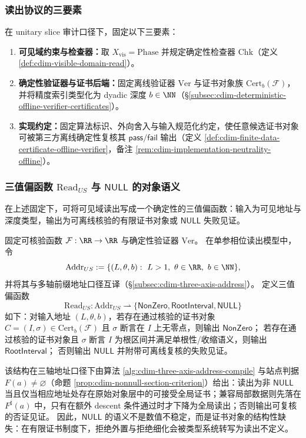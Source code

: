 \subsubsection{读出协议的三要素}
在 unitary slice 审计口径下，固定以下三要素：
\begin{enumerate}
  \item \textbf{可见域约束与检查器：}取 \(X_{\mathrm{vis}}=\mathrm{Phase}\) 并规定确定性检查器 \(\mathrm{Chk}\)（定义 \ref{def:cdim-visible-domain-read}）。
  \item \textbf{确定性验证器与证书后端：}固定离线验证器 \(\mathrm{Ver}\) 与证书对象族 \(\mathrm{Cert}_b(\mathcal F)\)，并将精度索引类型化为 dyadic 深度 \(b\in\NN\)（\S\ref{subsec:cdim-deterministic-offline-verifier-certificates}）。
  \item \textbf{实现约定：}固定算法标识、外向舍入与输入规范化约定，使任意候选证书对象可被第三方离线确定性复核其 \(\mathsf{pass}/\mathsf{fail}\) 输出（定义 \ref{def:cdim-finite-data-certificate-offline-verifier}，备注 \ref{rem:cdim-implementation-neutrality-offline}）。
\end{enumerate}

\subsubsection{三值偏函数 \texorpdfstring{$\mathrm{Read}_{US}$}{Read\_US} 与 \texorpdfstring{$\mathsf{NULL}$}{NULL} 的对象语义}
在上述固定下，可将可见域读出写成一个确定性的三值偏函数：输入为可见地址与深度类型，输出为可离线核验的有限证书对象或 \(\mathsf{NULL}\) 失败见证。
\begin{definition}\label{def:cdim-read-us-partial}
固定可核验函数 \(\mathcal F:\RR\to\RR\) 与确定性验证器 \(\mathrm{Ver}\)。
在单参相位读出模型中，令
\[
\mathrm{Addr}_{US}:=\{(L,\theta,b):\ L>1,\ \theta\in\RR,\ b\in\NN\},
\]
并将其与多轴前缀地址口径互译（\S\ref{subsec:cdim-three-axis-address}）。
定义三值偏函数
\[
\mathrm{Read}_{US}:\mathrm{Addr}_{US}\rightharpoonup \{\mathsf{NonZero},\mathsf{RootInterval},\mathsf{NULL}\}
\]
如下：对输入地址 \((L,\theta,b)\)，若存在通过核验的证书对象 \(C=(I,\sigma)\in\mathrm{Cert}_b(\mathcal F)\) 且 \(\sigma\) 断言在 \(I\) 上无零点，则输出 \(\mathsf{NonZero}\)；
若存在通过核验的证书对象且 \(\sigma\) 断言 \(I\) 为根区间并满足单根性/收缩语义，则输出 \(\mathsf{RootInterval}\)；
否则输出 \(\mathsf{NULL}\) 并附带可离线复核的失败见证。
\end{definition}
该结构在三轴地址口径下由算法 \ref{alg:cdim-three-axis-address-compile} 与站点判据 \(F(a)\neq\varnothing\)（命题 \ref{prop:cdim-nonnull-section-criterion}）给出：读出为非 \(\mathsf{NULL}\) 当且仅当相应地址处存在原始对象层中的可接受全局证书；兼容局部数据则先落在 \(F^\sharp(a)\) 中，只有在额外 descent 条件通过时才下降为全局读出；否则输出可复核的否证见证。
因此，\(\mathsf{NULL}\) 的语义不是数值不稳定，而是证书对象的结构性缺失：在有限证书制度下，拒绝外置与拒绝细化会被类型系统转写为读出不定义。


